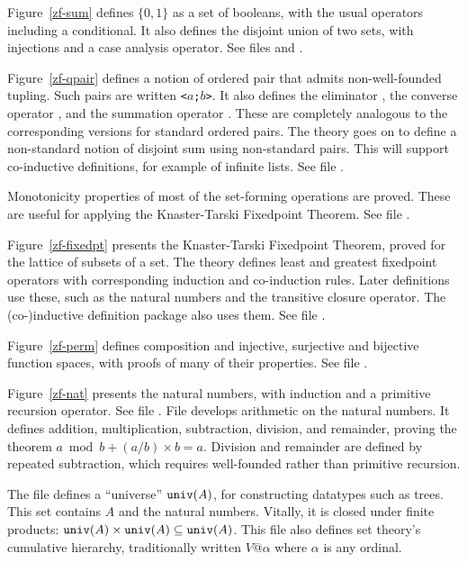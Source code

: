 Figure~\ref{zf-sum} defines $\{0,1\}$ as a set of booleans, with the usual
operators including a conditional.  It also defines the disjoint union of
two sets, with injections and a case analysis operator.  See files
 and .

Figure~\ref{zf-qpair} defines a notion of ordered pair that admits
non-well-founded tupling.  Such pairs are written {\tt<$a$;$b$>}.  It also
defines the eliminator , the converse operator
, and the summation operator .
These are completely analogous to the corresponding versions for standard
ordered pairs.  The theory goes on to define a non-standard notion of
disjoint sum using non-standard pairs.  This will support co-inductive
definitions, for example of infinite lists.  See file .

Monotonicity properties of most of the set-forming operations are proved.
These are useful for applying the Knaster-Tarski Fixedpoint Theorem.
See file .

Figure~\ref{zf-fixedpt} presents the Knaster-Tarski Fixedpoint Theorem, proved
for the lattice of subsets of a set.  The theory defines least and greatest
fixedpoint operators with corresponding induction and co-induction rules.
Later definitions use these, such as the natural numbers and
the transitive closure operator.  The (co-)inductive definition
package also uses them.    See file .

Figure~\ref{zf-perm} defines composition and injective, surjective and
bijective function spaces, with proofs of many of their properties.
See file .

Figure~\ref{zf-nat} presents the natural numbers, with induction and a
primitive recursion operator.  See file .  File
 develops arithmetic on the natural numbers.  It
defines addition, multiplication, subtraction, division, and remainder,
proving the theorem $a \bmod b + (a/b)\times b = a$.  Division and
remainder are defined by repeated subtraction, which requires well-founded
rather than primitive recursion.

The file  defines a ``universe'' ${\tt univ}(A)$,
for constructing datatypes such as trees.  This set contains $A$ and the
natural numbers.  Vitally, it is closed under finite products: ${\tt
  univ}(A)\times{\tt univ}(A)\subseteq{\tt univ}(A)$.  This file also
defines set theory's cumulative hierarchy, traditionally written $V@\alpha$
where $\alpha$ is any ordinal.

